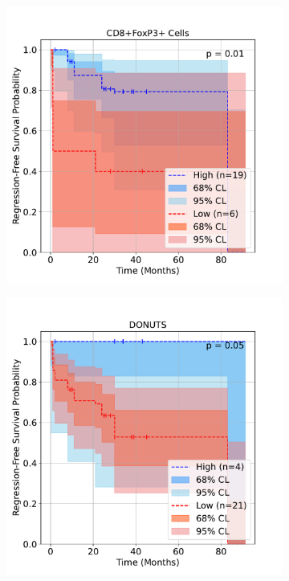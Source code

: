 \documentclass[article]{jss}
\begin{document}
\begin{figure}[p]
  \newcommand{\spacebetweenrows}{1em}
  \newcommand{\figwidth}{0.36\textwidth}
  \centering
  \begin{subfigure}[t]{\figwidth}
    \centering
    \includegraphics[width=\linewidth]{lung_cells_km_RFS.pdf}
    \caption{\label{fig:lung-dataset-cells}}
  \end{subfigure}
  \begin{subfigure}[t]{\figwidth}
    \centering
    \includegraphics[width=\linewidth]{lung_donuts_km_RFS.pdf}

\end{subfigure}
\end{figure}
\end{document}
